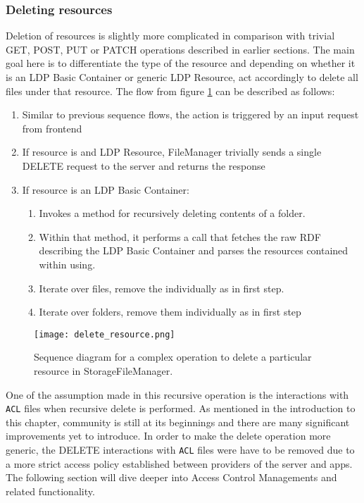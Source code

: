 \subsubsection{Deleting resources}

Deletion of resources is slightly more complicated in comparison with  trivial GET, POST, PUT or PATCH operations described in earlier sections. The main goal here is to differentiate the type of the resource and depending on whether it is an LDP Basic Container or generic LDP Resource, act accordingly to delete all files under that resource. 
The flow from figure \ref{fig:lps_delete_resource} can be described as follows:

\begin{enumerate}
    \item Similar to previous sequence flows, the action is triggered by an input request from \lpa{} frontend
    \item If resource is and LDP Resource, FileManager trivially sends 
   	a single DELETE request to the server and returns the response
    \item If resource is an LDP Basic Container:
    	\begin{enumerate}
    	\item Invokes a method for recursively deleting contents of a folder.
    	\item Within that method, it performs a call that fetches the raw RDF describing the LDP Basic Container and parses the resources contained within using. 
    	\item Iterate over files, remove the individually as in first step.
    	\item Iterate over folders, remove them individually as in first step 
    	\end{enumerate}
\end{enumerate}


\begin{figure}[h]
\centering
\texttt{[image: delete\_resource.png]}
\caption{Sequence diagram for a complex operation to delete a particular resource in StorageFileManager.}
\label{fig:lps_delete_resource}
\end{figure}


One of the assumption made in this recursive operation is the interactions with \texttt{ACL} files when recursive delete is performed. As mentioned in the introduction to this chapter, \solid{} community is still at its beginnings and there are many significant improvements yet to introduce. In order to make the delete operation more generic, the DELETE interactions with \texttt{ACL} files were have to be removed due to a more strict access policy established between providers of the server and \solid{} apps. The following section will dive deeper into Access Control Managements and related functionality.


